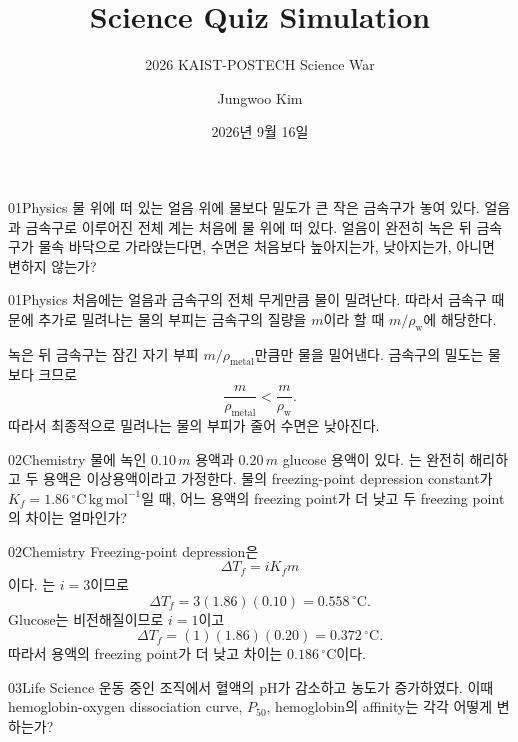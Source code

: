 \documentclass[12pt,aspectratio=169]{beamer}
\title[Science Quiz Simulation]{Science Quiz Simulation}
\subtitle{2026 KAIST-POSTECH Science War}
\author{Jungwoo Kim}
\institute{POSTECH}
\date{2026년 9월 16일}
\begin{document}
\begin{frame}
  \titlepage
\end{frame}
\addtocounter{framenumber}{1}

\begin{problemframe}{01}{Physics}
물 위에 떠 있는 얼음 위에 물보다 밀도가 큰 작은 금속구가 놓여 있다. 얼음과 금속구로 이루어진 전체 계는 처음에 물 위에 떠 있다. 얼음이 완전히 녹은 뒤 금속구가 물속 바닥으로 가라앉는다면, 수면은 처음보다 높아지는가, 낮아지는가, 아니면 변하지 않는가?
\end{problemframe}

\begin{solutionframe}{01}{Physics}
처음에는 얼음과 금속구의 전체 무게만큼 물이 밀려난다. 따라서 금속구 때문에 추가로 밀려나는 물의 부피는 금속구의 질량을 $m$이라 할 때 $m/\rho_{\mathrm w}$에 해당한다.

녹은 뒤 금속구는 잠긴 자기 부피 $m/\rho_{\mathrm{metal}}$만큼만 물을 밀어낸다. 금속구의 밀도는 물보다 크므로
\[
\frac{m}{\rho_{\mathrm{metal}}}<\frac{m}{\rho_{\mathrm w}}.
\]
따라서 최종적으로 밀려나는 물의 부피가 줄어 수면은 낮아진다.
\end{solutionframe}

\begin{problemframe}{02}{Chemistry}
물에 녹인 $0.10\,m$  용액과 $0.20\,m$ glucose 용액이 있다. 는 완전히 해리하고 두 용액은 이상용액이라고 가정한다. 물의 freezing-point depression constant가 $K_f=1.86\,{}^\circ\mathrm C\,\mathrm{kg}\,\mathrm{mol}^{-1}$일 때, 어느 용액의 freezing point가 더 낮고 두 freezing point의 차이는 얼마인가?
\end{problemframe}

\begin{solutionframe}{02}{Chemistry}
Freezing-point depression은
\[
\Delta T_f=iK_fm
\]
이다. 는 $i=3$이므로
\[
\Delta T_f=3(1.86)(0.10)=0.558\,{}^\circ\mathrm C.
\]
Glucose는 비전해질이므로 $i=1$이고
\[
\Delta T_f=(1)(1.86)(0.20)=0.372\,{}^\circ\mathrm C.
\]
따라서  용액의 freezing point가 더 낮고 차이는 $0.186\,{}^\circ\mathrm C$이다.
\end{solutionframe}

\begin{problemframe}{03}{Life Science}
운동 중인 조직에서 혈액의 pH가 감소하고  농도가 증가하였다. 이때 hemoglobin-oxygen dissociation curve, $P_{50}$, hemoglobin의  affinity는 각각 어떻게 변하는가?
\end{problemframe}
\end{document}
